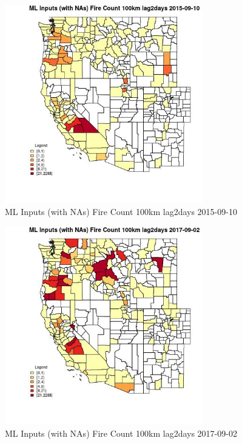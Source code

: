 \begin{figure} 
\centering  
\includegraphics[width=0.77\textwidth]{Code_Outputs/Report_ML_input_PM25_Step4_part_e_de_duplicated_aves_compiled_2019-05-21wNAs_CountyFire_Count_100km_lag2daysMean2015-09-10.jpg} 
\caption{\label{fig:Report_ML_input_PM25_Step4_part_e_de_duplicated_aves_compiled_2019-05-21wNAsCountyFire_Count_100km_lag2daysMean2015-09-10}ML Inputs (with NAs) Fire Count 100km lag2days 2015-09-10} 
\end{figure} 
 

\begin{figure} 
\centering  
\includegraphics[width=0.77\textwidth]{Code_Outputs/Report_ML_input_PM25_Step4_part_e_de_duplicated_aves_compiled_2019-05-21wNAs_CountyFire_Count_100km_lag2daysMean2017-09-02.jpg} 
\caption{\label{fig:Report_ML_input_PM25_Step4_part_e_de_duplicated_aves_compiled_2019-05-21wNAsCountyFire_Count_100km_lag2daysMean2017-09-02}ML Inputs (with NAs) Fire Count 100km lag2days 2017-09-02} 
\end{figure} 
 

